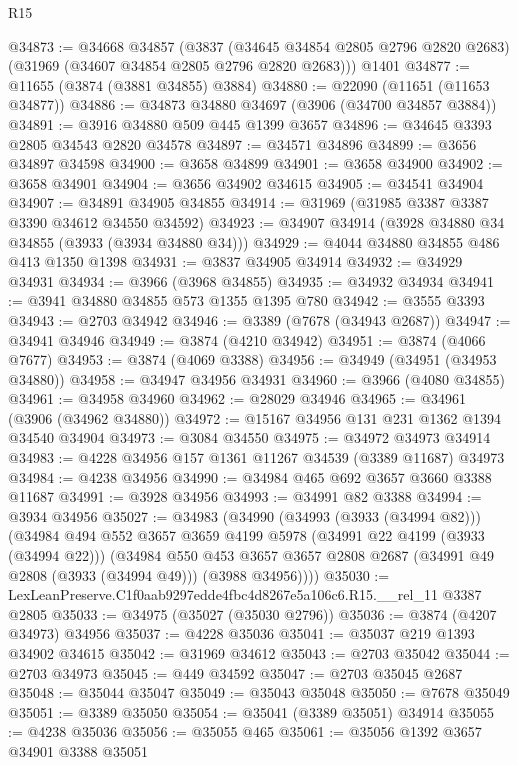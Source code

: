 \begin{lexlean}{R15}
\begin{coremodule}
@34873 := @34668
    @34857
    (@3837 (@34645 @34854 @2805 @2796 @2820 @2683) (@31969 (@34607 @34854 @2805 @2796 @2820 @2683)))
    @1401
@34877 := @11655 (@3874 (@3881 @34855) @3884)
@34880 := @22090 (@11651 (@11653 @34877))
@34886 := @34873 @34880 @34697 (@3906 (@34700 @34857 @3884))
@34891 := @3916 @34880 @509 @445 @1399 @3657
@34896 := @34645 @3393 @2805 @34543 @2820 @34578
@34897 := @34571 @34896
@34899 := @3656 @34897 @34598
@34900 := @3658 @34899
@34901 := @3658 @34900
@34902 := @3658 @34901
@34904 := @3656 @34902 @34615
@34905 := @34541 @34904
@34907 := @34891 @34905 @34855
@34914 := @31969 (@31985 @3387 @3387 @3390 @34612 @34550 @34592)
@34923 := @34907 @34914 (@3928 @34880 @34 @34855 (@3933 (@3934 @34880 @34)))
@34929 := @4044 @34880 @34855 @486 @413 @1350 @1398
@34931 := @3837 @34905 @34914
@34932 := @34929 @34931
@34934 := @3966 (@3968 @34855)
@34935 := @34932 @34934
@34941 := @3941 @34880 @34855 @573 @1355 @1395 @780
@34942 := @3555 @3393
@34943 := @2703 @34942
@34946 := @3389 (@7678 (@34943 @2687))
@34947 := @34941 @34946
@34949 := @3874 (@4210 @34942)
@34951 := @3874 (@4066 @7677)
@34953 := @3874 (@4069 @3388)
@34956 := @34949 (@34951 (@34953 @34880))
@34958 := @34947 @34956 @34931
@34960 := @3966 (@4080 @34855)
@34961 := @34958 @34960
@34962 := @28029 @34946
@34965 := @34961 (@3906 (@34962 @34880))
@34972 := @15167 @34956 @131 @231 @1362 @1394 @34540 @34904
@34973 := @3084 @34550
@34975 := @34972 @34973 @34914
@34983 := @4228 @34956 @157 @1361 @11267 @34539 (@3389 @11687) @34973
@34984 := @4238 @34956
@34990 := @34984 @465 @692 @3657 @3660 @3388 @11687
@34991 := @3928 @34956
@34993 := @34991 @82 @3388
@34994 := @3934 @34956
@35027 := @34983
    (@34990
      (@34993 (@3933 (@34994 @82)))
      (@34984
        @494
        @552
        @3657
        @3659
        @4199
        @5978
        (@34991 @22 @4199 (@3933 (@34994 @22)))
        (@34984
          @550
          @453
          @3657
          @3657
          @2808
          @2687
          (@34991 @49 @2808 (@3933 (@34994 @49)))
          (@3988 @34956))))
@35030 := LexLeanPreserve.C1f0aab9297edde4fbc4d8267e5a106c6.R15.__rel_11 @3387 @2805
@35033 := @34975 (@35027 (@35030 @2796))
@35036 := @3874 (@4207 @34973) @34956
@35037 := @4228 @35036
@35041 := @35037 @219 @1393 @34902 @34615
@35042 := @31969 @34612
@35043 := @2703 @35042
@35044 := @2703 @34973
@35045 := @449 @34592
@35047 := @2703 @35045 @2687
@35048 := @35044 @35047
@35049 := @35043 @35048
@35050 := @7678 @35049
@35051 := @3389 @35050
@35054 := @35041 (@3389 @35051) @34914
@35055 := @4238 @35036
@35056 := @35055 @465
@35061 := @35056 @1392 @3657 @34901 @3388 @35051

\end{coremodule}
\end{lexlean}

